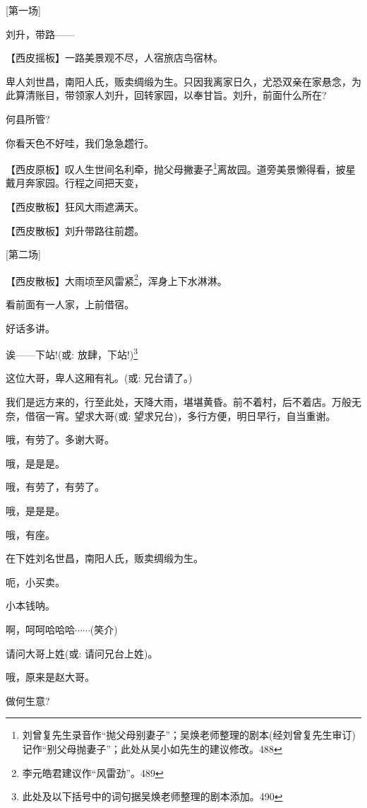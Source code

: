 {{[}第一场{]}}

{刘升，带路------}

\setlength{\hangindent}{60pt} {【{\akai 西皮摇板}】一路美景观不尽，人宿旅店鸟宿林。}

{卑人刘世昌，南阳人氏，贩卖绸缎为生。只因我离家日久，尤恐双亲在家悬念，为此算清账目，带领家人刘升，回转家园，以奉}甘旨{。刘升，前面什么所在?}

{何县所管?}

{你看天色不好哇，我们急急趱行。}

\setlength{\hangindent}{60pt} {【{\akai 西皮原板}】叹人生世间名利牵，抛父母撇妻子}\footnote{ 刘曾复先生录音作``抛父母别妻子''；吴焕老师整理的剧本(经刘曾复先生审订)记作``别父母抛妻子''；此处从吴小如先生的建议修改。{488}}{离故园。道旁美景懒得看，披星戴月奔家园。行程之间把天变，}

\setlength{\hangindent}{60pt} {【{\akai 西皮散板}】狂风大雨遮满天。}

\setlength{\hangindent}{60pt} {【{\akai 西皮散板}】刘升带路往前趱。}

{[}第二场{]}

\setlength{\hangindent}{60pt} {【{\akai 西皮散板}】大雨顷至风雷紧}\footnote{ 李元皓君建议作``风雷劲''。{489}}{，浑身上下水淋淋。}

{看前面有一人家，上前借宿。}

{好话多讲。}

{诶------下站!({\akai 或}: 放肆，下站!)}\footnote{ 此处及以下括号中的词句据吴焕老师整理的剧本添加。{490}}

{这位大哥，卑人这厢有礼。({\akai 或}: 兄台请了。)}

{我们是远方来的，行至此处，天降大雨，堪堪黄昏。前不着村，后不着店。万般无奈，借宿一宵。望求大哥({\akai 或}: 望求兄台)，多行方便，明日早行，自当重谢。}

{哦，有劳了。多谢大哥。}

{哦，是是是。}

{哦，有劳了，有劳了。}

{哦，是是是。}

{哦，有座。}

{在下姓刘名世昌，南阳人氏，贩卖绸缎为生。}

{呃，小买卖。}

{小本钱呐。}

{啊，呵呵哈哈哈$\cdots{}\cdots{}$(笑介)}

{请问大哥上姓({\akai 或}: 请问兄台上姓)。}

{哦，原来是赵大哥。}

{做何生意?}

